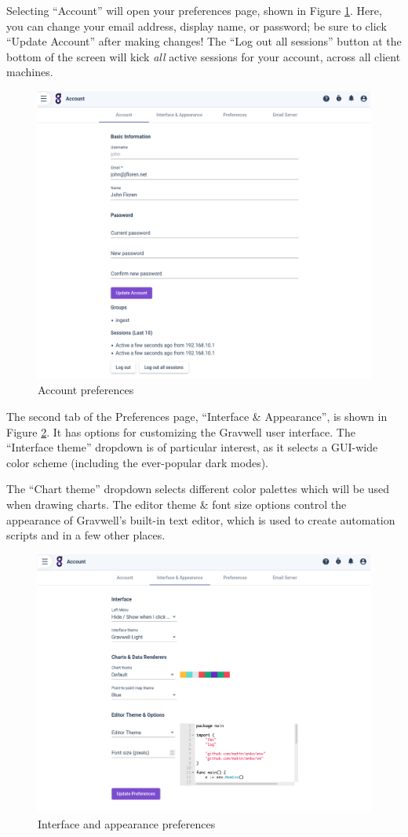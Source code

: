Selecting ``Account'' will open your preferences page, shown in Figure \ref{fig:account-prefs}. Here, you can change your email address, display name, or password; be sure to click ``Update Account'' after making changes! The ``Log out all sessions'' button at the bottom of the screen will kick \emph{all} active sessions for your account, across all client machines.

\begin{figure}
	\includegraphics[width=0.7\linewidth]{images/account-prefs.png}
	\caption{Account preferences}
	\label{fig:account-prefs}
\end{figure}

The second tab of the Preferences page, ``Interface \& Appearance'', is shown in Figure \ref{fig:interface-prefs}. It has options for customizing the Gravwell user interface. The ``Interface theme'' dropdown is of particular interest, as it selects a GUI-wide color scheme (including the ever-popular dark modes). 

The ``Chart theme'' dropdown selects different color palettes which will be used when drawing charts. The editor theme \& font size options control the appearance of Gravwell's built-in text editor, which is used to create automation scripts and in a few other places.

\begin{figure}
	\includegraphics[width=0.7\linewidth]{images/interface-prefs.png}
	\caption{Interface and appearance preferences}
	\label{fig:interface-prefs}
\end{figure}

